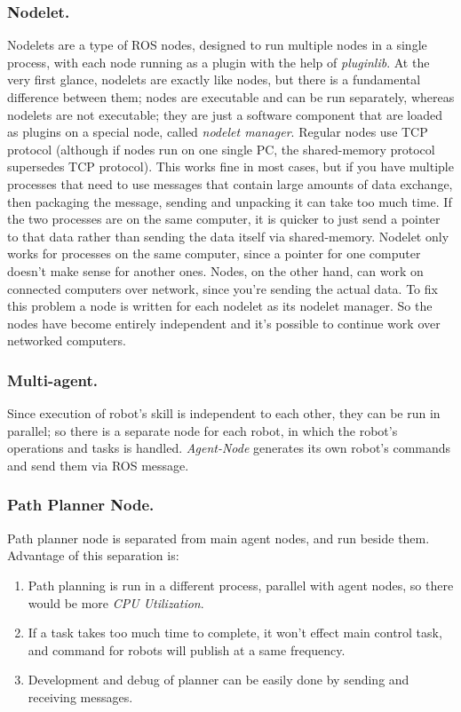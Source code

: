 \documentclass{llncs}
\begin{document}
\subsubsection{Nodelet.}
\label{subsubsec:Nodelet}

Nodelets are a type of ROS nodes, designed to run multiple nodes in a single process, with each node running as a plugin with the help of \textit{pluginlib}.
\newline At the very first glance, nodelets are exactly like nodes, but there is a fundamental difference between them; nodes are executable and can be run separately, whereas nodelets are not executable; they are just a software component that are loaded as plugins on a special node, called \textit{nodelet manager}.
\newline Regular nodes use TCP protocol (although if nodes run on one single PC, the shared-memory protocol supersedes TCP protocol). This works fine in most cases, but if you have multiple processes that need to use messages that contain large amounts of data exchange, then packaging the message, sending and unpacking it can take too much time. If the two processes are on the same computer, it is quicker to just send a pointer to that data rather than sending the data itself via shared-memory.
\newline Nodelet only works for processes on the same computer, since a pointer for one computer doesn't make sense for another ones. Nodes, on the other hand, can work on connected computers over network, since you're sending the actual data. To fix this problem a node is written for each nodelet as its nodelet manager. So the nodes have become entirely independent and it’s possible to continue work over networked computers.
\subsubsection{Multi-agent.}
\label{subsubsec:MUltiagent}
Since execution of robot’s skill is independent to each other, they can be run in parallel; so there is a separate node for each robot, in which the robot's operations and tasks is handled. \textit{Agent-Node} generates its own robot's commands and send them via ROS message.

\subsubsection{Path Planner Node.}
\label{subsubsec:PathPlannerNode}
	Path planner node is separated from main agent nodes, and run beside them. Advantage of this separation is:
    \begin{enumerate}
    \item Path planning is run in a different process, parallel with agent nodes, so there would be more \textit{CPU Utilization}.
    \item If a task takes too much time to complete, it won’t effect main control task, and command for robots will publish at a same frequency.
    \item Development and debug of planner can be easily done by sending and receiving messages.
    \end{enumerate}
\end{document}

